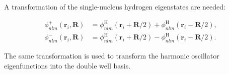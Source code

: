 \begin{frame}

 A transformation of the single-nucleus hydrogen eigenstates are needed:
 
\begin{align*}
 \phi_{nlm}^+ (\mathbf{r}_i, \mathbf{R}) &= \phi_{nlm}^\mathrm{H}(\mathbf{r}_i + \mathbf{R}/2) + \phi_{nlm}^\mathrm{H}(\mathbf{r}_i - \mathbf{R}/2)\label{eq:moleculeTransPlus}, \\
 \phi_{nlm}^- (\mathbf{r}_i, \mathbf{R}) &= \phi_{nlm}^\mathrm{H}(\mathbf{r}_i + \mathbf{R}/2) - \phi_{nlm}^\mathrm{H}(\mathbf{r}_i - \mathbf{R}/2)\label{eq:moleculeTransMin}.
\end{align*}
\shift 

The same transformation is used to transform the harmonic oscillator eigenfunctions into the double well basis.

\end{frame}



